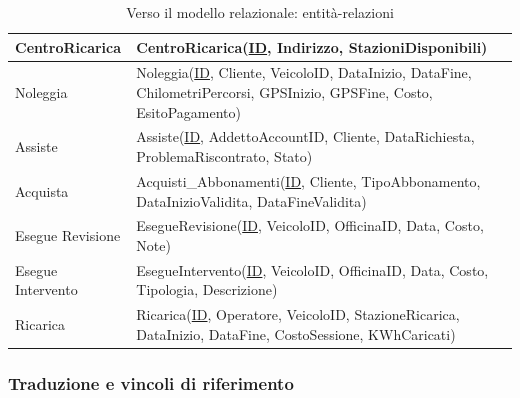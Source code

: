 \documentclass{article}
\begin{document}
\begin{table}[H]
\begin{tabularx}{\textwidth}{|p{3.1cm}|X|}
        CentroRicarica & CentroRicarica(\underline{ID}, Indirizzo, StazioniDisponibili) \\ \hline
        Noleggia & Noleggia(\underline{ID}, Cliente, VeicoloID, DataInizio, DataFine, ChilometriPercorsi, GPSInizio, GPSFine, Costo, EsitoPagamento)\\ \hline
        Assiste & Assiste(\underline{ID}, AddettoAccountID, Cliente, DataRichiesta, ProblemaRiscontrato, Stato)\\ \hline
        Acquista & Acquisti\_Abbonamenti(\underline{ID}, Cliente, TipoAbbonamento, DataInizioValidita, DataFineValidita) \\ \hline
        Esegue Revisione & EsegueRevisione(\underline{ID}, VeicoloID, OfficinaID, Data, Costo, Note) \\ \hline
        Esegue Intervento & EsegueIntervento(\underline{ID}, VeicoloID, OfficinaID, Data, Costo, Tipologia, Descrizione)\\ \hline
        Ricarica & Ricarica(\underline{ID}, Operatore, VeicoloID, StazioneRicarica, DataInizio, DataFine, CostoSessione, KWhCaricati) \\ \hline
    \end{tabularx}
    \caption{Verso il modello relazionale: entità-relazioni}
    \label{tab:entità-relazioni}
\end{table}

\subsubsection{Traduzione e vincoli di riferimento}
\end{document}
